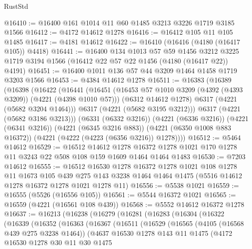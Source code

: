 \begin{lexlean}{RustStd}
\begin{coremodule}
{\begin{coremodule}
{{{{{{{{{{{{{{{{{{{{{{{{{{{{{{{@16410 := @16400 @161 @1014 @11 @60 @1485 @3213 @3226 @1719 @3185 @1566
@16412 := @4172 @14612 @1278
@16416 := @16412 @105 @11 @105 @1485
@16417 := @4181 @14612
@16422 := @16410 (@16416 (@4180 (@16417 @105)) @4418)
@16441 := @16400
    @134
    @1013
    @57
    @59
    @1456
    @3212
    @3225
    @1719
    @3194
    @1566
    (@16412 @22 @57 @22 @1456 (@4180 (@16417 @22)) @4191)
@16451 := @16400 @1011 @136 @57 @44 @3209 @1464 @1458 @1719 @3203 @1566
@16453 := @4384 @14612 @1278
@16511 := @16383
    (@16389
      (@16398
        (@16422
          (@16441
            (@16451
              (@16453 @57 @1010 @3209 (@4392 (@4393 @3209)) (@4221 (@4398 @1010 @57)))
              (@6312 @14612 @1278)
              @6317
              (@4221 (@5682 @3204 @1464)))
            @6317
            (@4221 (@5682 @3195 @3212)))
          @6317
          (@4221 (@5682 @3186 @3213)))
        (@6331 (@6332 @3216))
        (@4221 (@6336 @3216))
        (@4221 (@6341 @3216))
        (@4221 (@6345 @3216 @883))
        (@4221 (@6350 @1008 @883 @16372))
        (@4221 (@4222 (@4223 (@6356 @3216)) @1278))))
@16512 := @5464 @14612
@16529 := @16512
    @14612
    @1278
    @16372
    @1278
    @1021
    @170
    @1278
    @11
    @3243
    @22
    @508
    @108
    @159
    @1609
    @1464
    @1464
    @1483
@16530 := @7203 @14612
@16555 := @16512
    @16530
    @1278
    @16372
    @1278
    @1021
    @108
    @1278
    @11
    @1673
    @105
    @439
    @275
    @143
    @3238
    @1464
    @1464
    @1475
    (@5516 @14612 @1278 @16372 @1278 @1021 @1278 @11)
@16556 := @5538 @1021
@16559 := @16555 (@5526 (@16556 @105))
@16561 := @5544 @16372 @1021
@16565 := @16559 (@4221 (@16561 @108 @439))
@16568 := @5552 @14612 @16372 @1278
@16637 := @16213
    (@16238
      (@16279
        (@16281
          (@16283
            (@16304
              (@16322
                (@16339
                  (@16352
                    (@16363
                      (@16367
                        (@16511
                          (@16529
                            (@16565
                              (@4105 (@16568 @439 @275 @3238 @1464))
                              (@4637
                                @16530
                                @1278
                                @143
                                @11
                                @1475
                                (@4172
                                  @16530
                                  @1278
                                  @30
                                  @11
                                  @30
                                  @1475
}}}}}}}}}}}}}}}}}}}}}}}}}}}}}}}
\end{coremodule}}
\end{coremodule}
\end{lexlean}
